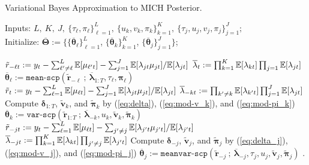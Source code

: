 \begin{algorithm}
\label{alg:1}
\caption{Variational Bayes Approximation to MICH Posterior.}

\footnotesize
\SetAlgoLined
  Inputs: $L,\:K,\:J,\:\{\tau_\ell,\pi_\ell\}_{\ell=1}^L,\:\{u_k,v_k,\pi_k\}_{k=1}^K,\:\{\tau_j,u_j,v_j,\pi_j\}_{j=1}^J;$ \\
  Initialize: $\overline{\boldsymbol{\Theta}} := \{\{\overline{\boldsymbol{\theta}}_\ell\}_{\ell=1}^L$, $\{\overline{\boldsymbol{\theta}}_k\}_{k=1}^K$, $\{\overline{\boldsymbol{\theta}}_j\}_{j=1}^J\}$;
  
   {
     {
      $\tilde{r}_{-\ell t} := y_t - \sum_{\ell' \neq \ell}^L \mathbb{E}[\mu_{\ell' t}] - \sum_{j =1}^J \mathbb{E}[\lambda_{jt} \mu_{jt}] / \mathbb{E}[\lambda_{jt}]$ 
      $\overline{\lambda}_{t} := \prod_{k=1}^K \mathbb{E}[\lambda_{kt}]\prod_{j=1}\mathbb{E}[\lambda_{jt}]$  
      $\overline{\boldsymbol{\theta}}_\ell := \texttt{mean-scp}(\tilde{\mathbf{r}}_{-\ell} \:;\: \overline{\boldsymbol{\lambda}}_{1:T}, \tau_{\ell}, \boldsymbol{\pi}_{\ell})$ 
    }
     {
      $\tilde{r}_{t} := y_t - \sum_{\ell = 1}^L \mathbb{E}[\mu_{\ell t}] - \sum_{j=1}^J \mathbb{E}[\lambda_{jt} \mu_{jt}] / \mathbb{E}[\lambda_{jt}]$  
      $\overline{\lambda}_{-kt} := \prod_{k' \neq k} \mathbb{E}[\lambda_{k't}]\prod_{j=1}^J\mathbb{E}[\lambda_{jt}] $  
      Compute $\boldsymbol{\delta}_{1:T}$, $\tilde{\mathbf{v}}_{k}$, and $\tilde{\boldsymbol{\pi}}_{k}$ by (\ref{eq:delta}), (\ref{eq:mod-v_k}), and (\ref{eq:mod-pi_k})  
      $\overline{\boldsymbol{\theta}}_k := \texttt{var-scp}(\tilde{\mathbf{r}}_{1:T} 
      \:;\:\overline{\boldsymbol{\lambda}}_{-k}, u_k, \tilde{\mathbf{v}}_{k}, \tilde{\boldsymbol{\pi}}_k)$ 
    }
     {
      $\tilde{r}_{-jt} := y_t - \sum_{\ell = 1}^L \mathbb{E}[\mu_{\ell t}] - \sum_{j' \neq j} \mathbb{E}[\lambda_{j't} \mu_{j't}] / \mathbb{E}[\lambda_{j't}]$  
      $\overline{\lambda}_{-jt} := \prod_{k=1}^K \mathbb{E}[\lambda_{kt}]\prod_{j' \neq j}\mathbb{E}[\lambda_{j't}] $ 
      Compute $\boldsymbol{\delta}_{-j}$, $\tilde{\mathbf{v}}_{j}$, and $\tilde{\boldsymbol{\pi}}_{j}$ by (\ref{eq:delta_j}), (\ref{eq:mod-v_j}), and (\ref{eq:mod-pi_j})  
      $\overline{\boldsymbol{\theta}}_j := \texttt{meanvar-scp}(\tilde{\mathbf{r}}_{-j} \:;\:\overline{\boldsymbol{\lambda}}_{-j}, \tau_j, u_j, \tilde{\mathbf{v}}_{j}, \tilde{\boldsymbol{\pi}}_j)$ 
    }
  }
  .
\end{algorithm}